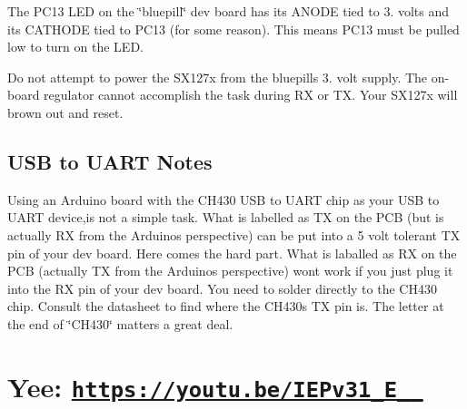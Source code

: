 \begin{DoxyItemize}
\item The P\+C13 L\+ED on the \char`\"{}bluepill\char`\"{} dev board has it\textquotesingle{}s A\+N\+O\+DE tied to 3. volts and it\textquotesingle{}s C\+A\+T\+H\+O\+DE tied to P\+C13 (for some reason). This means P\+C13 must be pulled low to turn on the L\+ED.
\item Do not attempt to power the S\+X127x from the bluepill\textquotesingle{}s 3. volt supply. The on-\/board regulator cannot accomplish the task during RX or TX. Your S\+X127x will brown out and reset. \subsection*{U\+SB to U\+A\+RT Notes}
\end{DoxyItemize}


\begin{DoxyItemize}
\item Using an Arduino board with the C\+H430 U\+SB to U\+A\+RT chip as your U\+SB to U\+A\+RT device,is not a simple task. What is labelled as TX on the P\+CB (but is actually RX from the Arduino\textquotesingle{}s perspective) can be put into a 5 volt tolerant TX pin of your dev board. Here comes the hard part. What is laballed as RX on the P\+CB (actually TX from the Arduino\textquotesingle{}s perspective) won\textquotesingle{}t work if you just plug it into the RX pin of your dev board. You need to solder directly to the C\+H430 chip. Consult the datasheet to find where the C\+H430\textquotesingle{}s TX pin is. The letter at the end of \char`\"{}\+C\+H430\char`\"{} matters a great deal.
\end{DoxyItemize}

\section*{Yee\+: \href{https://youtu.be/IEPv31_E__4}{\tt https\+://youtu.\+be/\+I\+E\+Pv31\+\_\+\+E\+\_\+\+\_}}

 